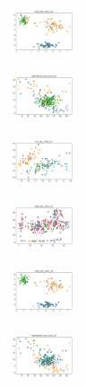 \begin{figure}[H]
\begin{subfigure}
        \centering
        \includegraphics[width=0.234\textwidth]{img/hs-ls/rand_set_const_10_277451237_clust.png}
    \end{subfigure}
    \hfill
    \begin{subfigure}
        \centering
        \includegraphics[width=0.234\textwidth]{img/hs-ls/newthyroid_set_const_10_277451237_clust.png}
    \end{subfigure}
    \hfill
    \begin{subfigure}
        \centering
        \includegraphics[width=0.234\textwidth]{img/hs-ls/iris_set_const_10_49258669_clust.png}
    \end{subfigure}
    \hfill
    \begin{subfigure}
        \centering
        \includegraphics[width=0.234\textwidth]{img/hs-ls/ecoli_set_const_10_49258669_clust.png}
    \end{subfigure}
    \hfill
    \begin{subfigure}
        \centering
        \includegraphics[width=0.234\textwidth]{img/hs-ls/rand_set_const_10_49258669_clust.png}
    \end{subfigure}
    \hfill
    \begin{subfigure}
        \centering
        \includegraphics[width=0.234\textwidth]{img/hs-ls/newthyroid_set_const_10_49258669_clust.png}

\end{subfigure}
\end{figure}
